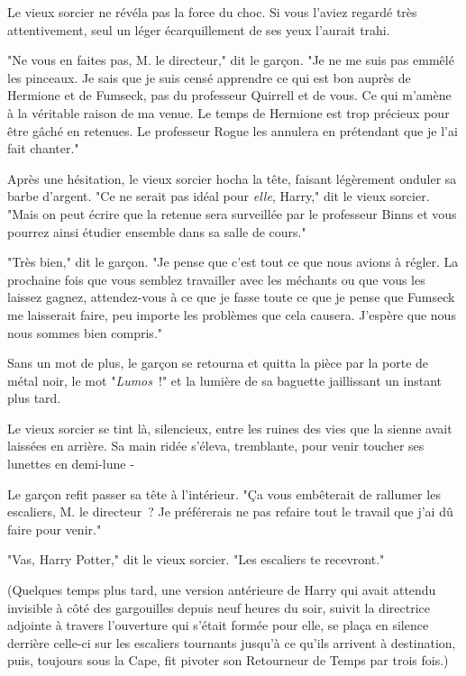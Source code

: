Le vieux sorcier ne révéla pas la force du choc. Si vous l'aviez regardé très attentivement, seul un léger écarquillement de ses yeux l'aurait trahi.

"Ne vous en faites pas, M. le directeur," dit le garçon. "Je ne me suis pas emmêlé les pinceaux. Je sais que je suis censé apprendre ce qui est bon auprès de Hermione et de Fumseck, pas du professeur Quirrell et de vous. Ce qui m'amène à la véritable raison de ma venue. Le temps de Hermione est trop précieux pour être gâché en retenues. Le professeur Rogue les annulera en prétendant que je l'ai fait chanter."

Après une hésitation, le vieux sorcier hocha la tête, faisant légèrement onduler sa barbe d'argent. "Ce ne serait pas idéal pour \emph{elle}, Harry," dit le vieux sorcier. "Mais on peut écrire que la retenue sera surveillée par le professeur Binns et vous pourrez ainsi étudier ensemble dans sa salle de cours."

"Très bien," dit le garçon. "Je pense que c'est tout ce que nous avions à régler. La prochaine fois que vous semblez travailler avec les méchants ou que vous les laissez gagnez, attendez-vous à ce que je fasse toute ce que je pense que Fumseck me laisserait faire, peu importe les problèmes que cela causera. J'espère que nous nous sommes bien compris."

Sans un mot de plus, le garçon se retourna et quitta la pièce par la porte de métal noir, le mot "\emph{Lumos}~!" et la lumière de sa baguette jaillissant un instant plus tard.

Le vieux sorcier se tint là, silencieux, entre les ruines des vies que la sienne avait laissées en arrière. Sa main ridée s'éleva, tremblante, pour venir toucher ses lunettes en demi-lune -

Le garçon refit passer sa tête à l'intérieur. "Ça vous embêterait de rallumer les escaliers, M. le directeur~? Je préférerais ne pas refaire tout le travail que j'ai dû faire pour venir."

"Vas, Harry Potter," dit le vieux sorcier. "Les escaliers te recevront."

(Quelques temps plus tard, une version antérieure de Harry qui avait attendu invisible à côté des gargouilles depuis neuf heures du soir, suivit la directrice adjointe à travers l'ouverture qui s'était formée pour elle, se plaça en silence derrière celle-ci sur les escaliers tournants jusqu'à ce qu'ils arrivent à destination, puis, toujours sous la Cape, fit pivoter son Retourneur de Temps par trois fois.)

